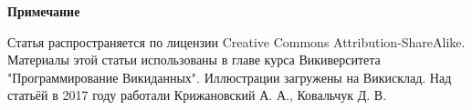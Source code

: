 
\textbf{Примечание}

Статья распространяется по лицензии Creative Commons Attribution-ShareAlike. Материалы этой статьи использованы в главе курса Викиверситета "Программирование Викиданных"\cite{WDProgrammingLanguage}. Иллюстрации загружены на Викисклад. Над статьёй в 2017 году работали Крижановский А. А., Ковальчук Д. В. 